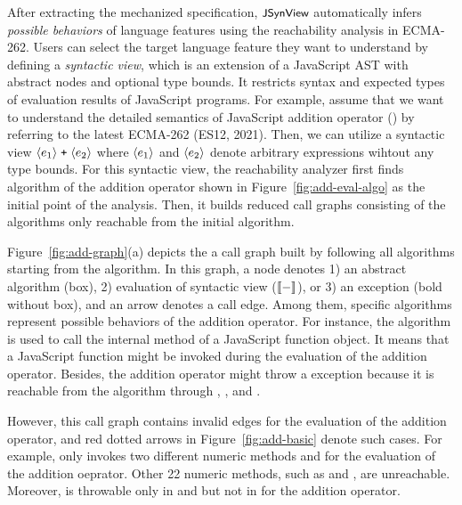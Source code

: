 After extracting the mechanized specification, $\textsf{\small JSynView}$ automatically infers
\textit{possible behaviors} of language features using the reachability analysis
in ECMA-262.  Users can select the target language feature they want to
understand by defining a \textit{syntactic view}, which is an extension of a
JavaScript AST with abstract nodes and optional type bounds.  It restricts
syntax and expected types of evaluation results of JavaScript programs.  For
example, assume that we want to understand the detailed semantics of JavaScript
addition operator (\code{+}) by referring to the latest ECMA-262 (ES12, 2021).
Then, we can utilize a syntactic view $\langle e_1 \rangle \; \texttt{+} \;
\langle e_2 \rangle$ where $\langle e_1 \rangle$ and $\langle e_2 \rangle$ denote
arbitrary expressions wihtout any type bounds.  For this syntactic view, the
reachability analyzer first finds  algorithm of the addition
operator shown in Figure~\ref{fig:add-eval-algo} as the initial point of the
analysis.  Then, it builds reduced call graphs consisting of the algorithms only
reachable from the initial algorithm.

Figure~\ref{fig:add-graph}(a) depicts the a call graph built by following all
algorithms starting from the  algorithm.  In this graph, a
node denotes 1) an abstract algorithm (box), 2) evaluation of syntactic view
($\llbracket{-}\rrbracket$), or 3) an exception (bold without box), and an arrow denotes a call
edge.  Among them, specific algorithms represent possible behaviors of the
addition operator.  For instance, the  algorithm is used to call the
\eswrd{[[Call]]} internal method of a JavaScript function object.  It means that
a JavaScript function might be invoked during the evaluation of the addition
operator.  Besides, the addition operator might throw a 
exception because it is reachable from the  algorithm through
, , and .

However, this call graph contains invalid edges for the evaluation of the
addition operator, and red dotted arrows in Figure~\ref{fig:add-basic} denote
such cases.  For example,  only
invokes two different numeric methods  and
 for the evaluation of the addition oeprator.  Other 22
numeric methods, such as  and ,
are unreachable.  Moreover,  is throwable only in
 and  but not in  for the
addition operator.


